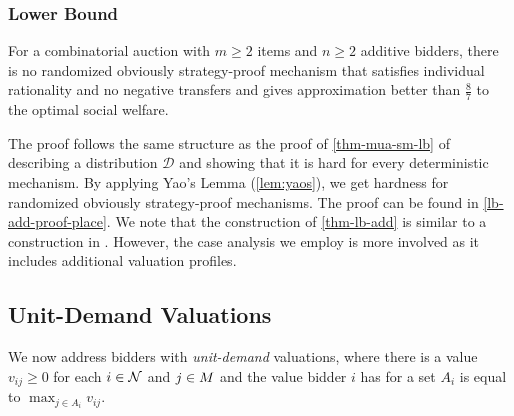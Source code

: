 \subsubsection{Lower Bound}
\begin{theorem}\label{thm-lb-add}
For a combinatorial auction with $m\ge 2$ items and $n\ge 2$ additive bidders, there 
is no randomized obviously strategy-proof mechanism that satisfies individual rationality and no negative transfers and gives approximation better than $\frac{8}{7}$ to the optimal social welfare.
\end{theorem}
The proof follows the same structure as the proof of \cref{thm-mua-sm-lb} of describing 
a distribution $\mathcal D$ and showing that it is hard for every deterministic mechanism. By applying Yao's Lemma (\cref{lem:yaos}), we get hardness for randomized obviously strategy-proof mechanisms. 
The proof can be found in \cref{lb-add-proof-place}. 
We note that the construction of \cref{thm-lb-add} is similar to a construction in \cite{Ron24}.  However, the case analysis we employ is more involved as it includes additional valuation profiles. 


\subsection{Unit-Demand Valuations}
We now address bidders with \emph{unit-demand} valuations, where there is a value $v_{ij} \geq 0$ for each $i \in \mathcal{N}$ and  $j \in M$ and the value bidder $i$ has for a set $A_i$ is equal to $\max_{j \in A_i}{v_{ij}}$. 





